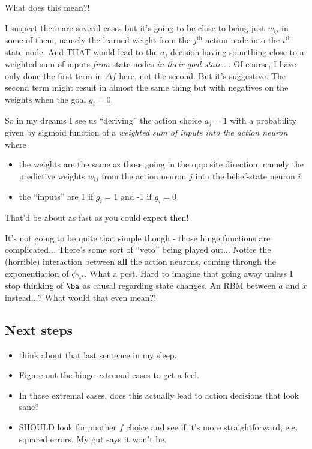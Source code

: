 \documentclass[11pt]{article}
\begin{document}
What does this mean?!

I suspect there are several cases but it's going to be close to being just $w_{ij}$ in some of them, namely the learned weight from the $j^\text{th}$ action node into the $i^\text{th}$ state node. And THAT would lead to the $a_j$ decision having something close to a weighted sum of inputs {\it from } state nodes {\it in their goal state}.... Of course, I have only done the first term in $\Delta f$ here, not the second. But it's suggestive. The second term might result in almost the same thing but with negatives on the weights when the goal $g_i=0$. 

So in my dreams I see us ``deriving'' the action choice $a_j=1$ with a probability given by sigmoid function of a {\it weighted sum of inputs into the action neuron} where 
\begin{itemize}
 \item the weights are the same as those going in the opposite direction, namely the predictive weights $w_{ij}$ from the action neuron $j$ into the belief-state neuron $i$;
 \item the ``inputs'' are 1 if $g_i=1$ and -1 if $g_i=0$
\end{itemize}
That'd be about as fast as you could expect then!

It's not going to be quite that simple though - those hinge functions are complicated... There's some sort of ``veto'' being played out... Notice the (horrible) interaction between {\bf all} the action neurons, coming through the exponentiation of $\phi_{\mathbf{\backslash} j}$. What a pest. Hard to imagine that going away unless I stop thinking of $\ba$ as causal regarding state changes. An RBM between $a$ and $x$ instead...? What would that even mean?!

\subsection{Next steps}
\begin{itemize}
\item think about that last sentence in my sleep.
\item Figure out the hinge extremal cases to get a feel.
\item In those extremal cases, does this actually lead to action decisions that look sane?
\item SHOULD look for another $f$ choice and see if it's more straightforward, e.g. squared errors. My gut says it won't be.
\end{itemize}
\end{document}

